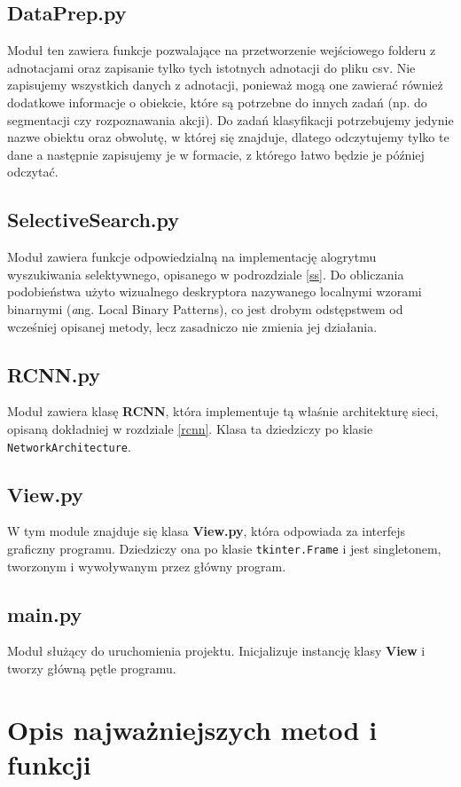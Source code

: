 \documentclass[a4paper,twoside,12pt]{book}
\newcommand{\obcy}[1]{\emph{#1}}
\newcommand{\ang}[1]{{\selectlanguage{british}\obcy{#1}}}
\begin{document}
{\subsection{DataPrep.py}
{Moduł ten zawiera funkcje pozwalające na przetworzenie wejściowego folderu z adnotacjami oraz zapisanie tylko tych istotnych adnotacji do pliku csv. Nie zapisujemy wszystkich danych z adnotacji, ponieważ mogą one zawierać również dodatkowe informacje o obiekcie, które są potrzebne do innych zadań (np. do segmentacji czy rozpoznawania akcji). Do zadań klasyfikacji potrzebujemy jedynie nazwe obiektu oraz obwolutę, w której się znajduje, dlatego odczytujemy tylko te dane a następnie zapisujemy je w formacie, z którego łatwo będzie je później odczytać. }
\subsection{SelectiveSearch.py}
{Moduł zawiera funkcje odpowiedzialną na implementację alogrytmu wyszukiwania selektywnego, opisanego w podrozdziale \ref{ss}. Do obliczania podobieństwa użyto wizualnego deskryptora nazywanego localnymi wzorami binarnymi (\ang  ang. Local Binary Patterns), co jest drobym odstępstwem od wcześniej opisanej metody, lecz zasadniczo nie zmienia jej działania. }
\subsection{RCNN.py}
{Moduł zawiera klasę \textbf{RCNN}, która implementuje tą właśnie architekturę sieci, opisaną dokładniej w rozdziale \ref{rcnn}. Klasa ta dziedziczy po klasie \lstinline|NetworkArchitecture|. }
\subsection{View.py}
{W tym module znajduje się klasa \textbf{View.py}, która odpowiada za interfejs graficzny programu. Dziedziczy ona po klasie \lstinline|tkinter.Frame| i jest singletonem, tworzonym i wywoływanym przez główny program.}
\subsection{main.py}
{Moduł służący do uruchomienia projektu. Inicjalizuje instancję klasy \textbf{View} i tworzy główną pętle programu.}

\section{Opis najważniejszych metod i funkcji}
}
\end{document}
